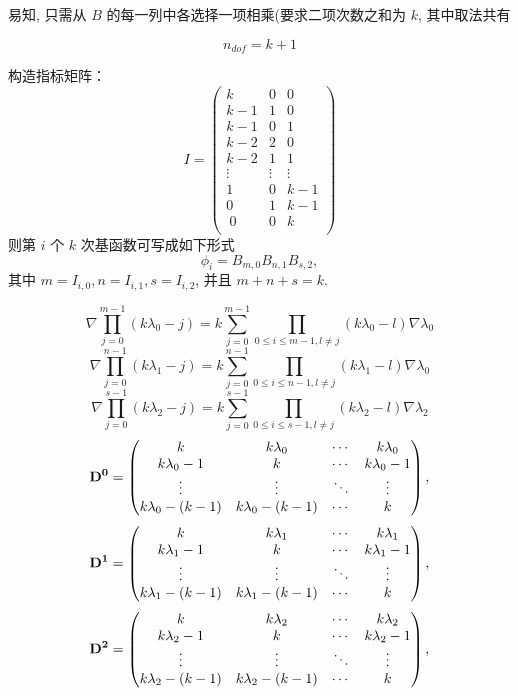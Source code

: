 \documentclass[12pt,a4paper]{article}
\begin{document}
易知, 只需从 $B$ 的每一列中各选择一项相乘(要求二项次数之和为 $k$,
其中取法共有

\[
n_{dof} = {k+1}
\]

构造指标矩阵：
$$
I = \begin{pmatrix}
k  & 0 & 0\\ k-1 & 1 & 0\\ k-1 & 0 & 1\\k-2 & 2 & 0\\ k-2 & 1 & 1\\\vdots & \vdots & \vdots\\1 & 0& k-1\\ 0 & 1& k-1\\\ 0 & 0& k\\

\end{pmatrix}
$$
则第 $i$ 个 $k$ 次基函数可写成如下形式
$$
\phi_i = B_{m,0}B_{n,1}B_{s,2}, 
$$
其中 $ m = I_{i, 0}, n = I_{i, 1}, s = I_{i, 2} $, 并且 $ m + n+s = k$.

$$\nabla \prod_{j=0}^{m-1}\left(k \lambda_{0}-j\right)=k \sum_{j=0}^{m-1} \prod_{0 \leq i \leq m-1, l \neq j}\left(k \lambda_{0}-l\right) \nabla \lambda_{0}$$
$$\nabla \prod_{j=0}^{n-1}\left(k \lambda_{1}-j\right)=k \sum_{j=0}^{n-1} \prod_{0 \leq i \leq n-1, l \neq j}\left(k \lambda_{1}-l\right) \nabla \lambda_{0}$$
$$\nabla \prod_{j=0}^{s-1}\left(k \lambda_{2}-j\right)=k \sum_{j=0}^{s-1} \prod_{0 \leq i \leq s-1, l \neq j}\left(k \lambda_{2}-l\right) \nabla \lambda_{2}$$
\begin{equation*}
	\bf D^0 = 
	\begin{pmatrix}
		k & k\lambda_0 & \cdots & k\lambda_0 \\
		k\lambda_0 - 1 & k & \cdots & k\lambda_0 - 1 \\
		\vdots & \vdots & \ddots & \vdots \\
		k\lambda_0 - (k-1) & k\lambda_0 - (k-1) & \cdots & k 
	\end{pmatrix},
\end{equation*}
\begin{equation*}
	\bf D^1 = 
	\begin{pmatrix}
		k & k \lambda_1 & \cdots & k\lambda_1 \\
		k\lambda_1 - 1 & k & \cdots & k\lambda_1 - 1 \\
		\vdots & \vdots & \ddots & \vdots \\
		k\lambda_1 - (k-1) & k\lambda_1 - (k-1) & \cdots & k 
	\end{pmatrix},
\end{equation*}
\begin{equation*}
	\bf D^2 = 
	\begin{pmatrix}
		k & k\lambda_2 & \cdots & k\lambda_2 \\
		k\lambda_2 - 1 & k & \cdots & k\lambda_2 - 1 \\
		\vdots & \vdots & \ddots & \vdots \\
		k\lambda_2 - (k-1) & k\lambda_2 - (k-1) & \cdots & k 
	\end{pmatrix},
\end{equation*}
\end{document}
